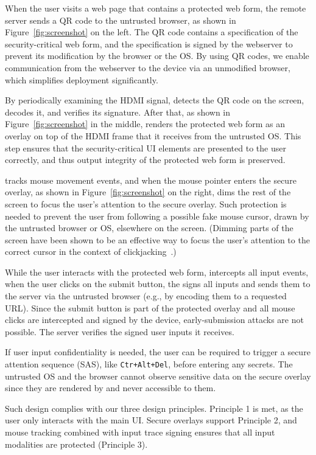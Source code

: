 When the user visits a web page that contains a protected web form, the remote server sends a QR code to the untrusted browser, as shown in Figure~\ref{fig:screenshot} on the left. The QR code contains a specification of the security-critical web form, and the specification is signed by the webserver to prevent its modification by the browser or the OS. By using QR codes, we enable communication from the webserver to the \hub device via an unmodified browser, which simplifies deployment significantly.

By periodically examining the HDMI signal, \hub detects the QR code on the screen, decodes it, and verifies its signature. After that, as shown in Figure~\ref{fig:screenshot} in the middle, \hub renders the protected web form as an overlay on top of the HDMI frame that it receives from the untrusted OS. This step ensures that the security-critical UI elements are presented to the user correctly, and thus output integrity of the protected web form is preserved.

\hub tracks mouse movement events, and when the mouse pointer enters the secure overlay, as shown in Figure~\ref{fig:screenshot} on the right, \hub dims the rest of the screen to focus the user's attention to the secure overlay. Such protection is needed to prevent the user from following a possible fake mouse cursor, drawn by the untrusted browser or OS, elsewhere on the screen. (Dimming parts of the screen have been shown to be an effective way to focus the user's attention to the correct cursor in the context of clickjacking~\cite{huang2012clickjacking}.)

While the user interacts with the protected web form, \hub intercepts all input events, when the user clicks on the submit button, the \hub signs all inputs and sends them to the server via the untrusted browser (e.g., by encoding them to a requested URL). Since the submit button is part of the protected overlay and all mouse clicks are intercepted and signed by the \hub device, early-submission attacks are not possible. The server verifies the signed user inputs it receives. 

If user input confidentiality is needed, the user can be required to trigger a secure attention sequence (SAS), like \texttt{Ctr+Alt+Del}, before entering any secrets. The untrusted OS and the browser cannot observe sensitive data on the secure overlay since they are rendered by \hub and never accessible to them.

Such design complies with our three design principles. Principle 1 is met, as the user only interacts with the main UI. Secure overlays support Principle 2, and mouse tracking combined with input trace signing ensures that all input modalities are protected (Principle 3).

